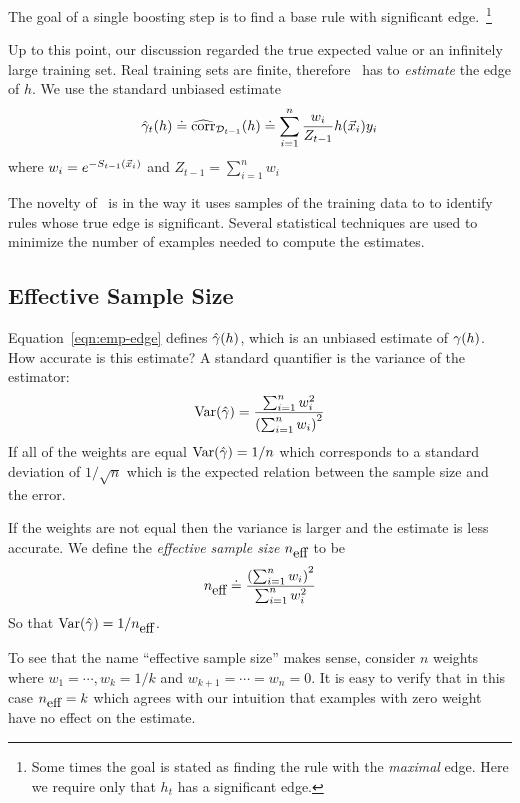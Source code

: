 The goal of a single boosting step is to find a base rule with
significant edge.~\footnote{Some times the goal is stated as
  finding the rule with the {\em maximal} edge.  Here we require only
  that $h_t$ has a significant edge.}

Up to this point, our discussion regarded the true expected value or
an infinitely large training set. Real training sets are finite, 
therefore \Sparrow\ has to {\em
  estimate} the edge of $h$. We use the standard unbiased estimate
\begin{equation} \label{eqn:emp-edge}
\hat{\gamma}_{t}(h) \doteq \widehat{\mbox{corr}}_{{\cal D}_{t-1}}(h)
\doteq 
\sum_{i=1}^n \frac{w_i}{Z_{t-1}} h(\vec{x}_i) y_i
\end{equation}
where  $w_i = e^{-S_{t-1}(\vec{x}_i)}$ and $Z_{t-1} = \sum_{i=1}^n w_i$

The novelty of \Sparrow\ is in the way it uses samples of the training
data to to identify rules whose true edge is significant.
Several statistical techniques are used to minimize the number of
examples needed to compute the estimates.

\subsection{Effective Sample Size}
\label{sec:effectiveSampleSize}
Equation~\ref{eqn:emp-edge} defines $\hat{\gamma}(h)$, which is an
unbiased estimate of $\gamma(h)$. How accurate is this estimate? A
standard quantifier is the variance of the estimator:
\begin{equation} \label{eqn:variance}
 \mbox{Var}(\hat{\gamma}) = \frac{\sum_{i=1}^n w_i^2}{\left(\sum_{i=1}^n w_i\right)^2}
\end{equation}
If all of the weights are equal $\mbox{Var}(\hat{\gamma}) = 1/n$ which
corresponds to a standard deviation of $1/\sqrt{n}$ which is the
expected relation between the sample size and the error.

If the weights are not equal then the variance is larger and the
estimate is less accurate. We define the {\em effective sample size}
${n_{\mbox{eff}}}$ to be
\begin{equation} \label{eqn:neff}
  {n_{\mbox{eff}}} \doteq \frac{\left(\sum_{i=1}^n w_i\right)^2}{\sum_{i=1}^n w_i^2}
\end{equation}
So that $\mbox{Var}(\hat{\gamma}) = 1/{n_{\mbox{eff}}}$.

To see that the name ``effective sample size'' makes sense, consider
$n$ weights where $w_1=\cdots,w_k=1/k$ and
$w_{k+1}=\cdots=w_{n}=0$. It is easy to verify that in this case
${n_{\mbox{eff}}}=k$ which agrees with our intuition that examples with zero
weight have no effect on the estimate.

